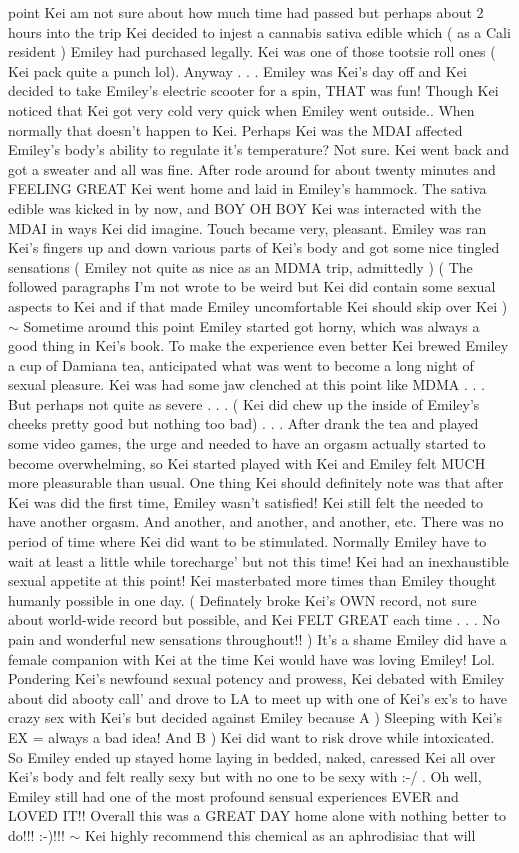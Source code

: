 \documentclass[12pt]{book}
\begin{document}
point Kei am not sure about how much time had passed but perhaps about 2 hours into the trip Kei decided to injest a cannabis sativa edible which ( as a Cali resident ) Emiley had purchased legally. Kei was one of those tootsie roll ones ( Kei pack quite a punch lol). Anyway . . .  Emiley was Kei's day off and Kei decided to take Emiley's electric scooter for a spin, THAT was fun! Though Kei noticed that Kei got very cold very quick when Emiley went outside.. When normally that doesn't happen to Kei. Perhaps Kei was the MDAI affected Emiley's body's ability to regulate it's temperature? Not sure. Kei went back and got a sweater and all was fine. After rode around for about twenty minutes and FEELING GREAT Kei went home and laid in Emiley's hammock. The sativa edible was kicked in by now, and BOY OH BOY Kei was interacted with the MDAI in ways Kei did imagine. Touch became very, pleasant. Emiley was ran Kei's fingers up and down various parts of Kei's body and got some nice tingled sensations ( Emiley not quite as nice as an MDMA trip, admittedly ) ( The followed paragraphs I'm not wrote to be weird but Kei did contain some sexual aspects to Kei and if that made Emiley uncomfortable Kei should skip over Kei ) $\sim$ Sometime around this point Emiley started got horny, which was always a good thing in Kei's book. To make the experience even better Kei brewed Emiley a cup of Damiana tea, anticipated what was went to become a long night of sexual pleasure. Kei was had some jaw clenched at this point like MDMA . . .  But perhaps not quite as severe . . .  ( Kei did chew up the inside of Emiley's cheeks pretty good but nothing too bad) . . .  After drank the tea and played some video games, the urge and needed to have an orgasm actually started to become overwhelming, so Kei started played with Kei and Emiley felt MUCH more pleasurable than usual. One thing Kei should definitely note was that after Kei was did the first time, Emiley wasn't satisfied! Kei still felt the needed to have another orgasm. And another, and another, and another, etc. There was no period of time where Kei did want to be stimulated. Normally Emiley have to wait at least a little while torecharge' but not this time! Kei had an inexhaustible sexual appetite at this point! Kei masterbated more times than Emiley thought humanly possible in one day. ( Definately broke Kei's OWN record, not sure about world-wide record but possible, and Kei FELT GREAT each time . . .  No pain and wonderful new sensations throughout!! ) It's a shame Emiley did have a female companion with Kei at the time Kei would have was loving Emiley! Lol. Pondering Kei's newfound sexual potency and prowess, Kei debated with Emiley about did abooty call' and drove to LA to meet up with one of Kei's ex's to have crazy sex with Kei's but decided against Emiley because A ) Sleeping with Kei's EX = always a bad idea! And B ) Kei did want to risk drove while intoxicated. So Emiley ended up stayed home laying in bedded, naked, caressed Kei all over Kei's body and felt really sexy but with no one to be sexy with :-/ . Oh well, Emiley still had one of the most profound sensual experiences EVER and LOVED IT!! Overall this was a GREAT DAY home alone with nothing better to do!!! :-)!!! $\sim$ Kei highly recommend this chemical as an aphrodisiac that will 
\end{document}

